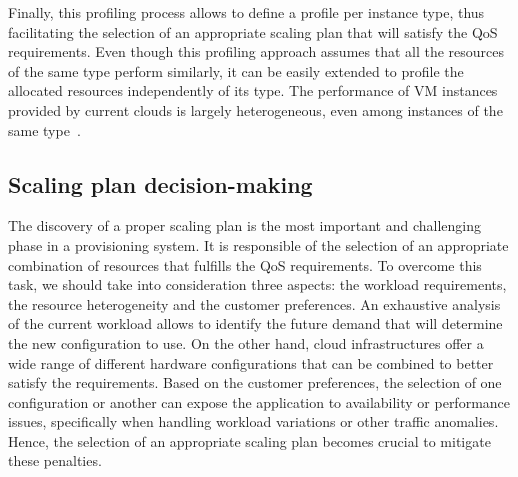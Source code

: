 \vspace{2mm}
Finally, this profiling process allows to define a profile per instance type, thus facilitating the selection of an appropriate scaling plan that will satisfy the QoS requirements. Even though this profiling approach assumes that all the resources of the same type perform similarly, it can be easily extended to profile the allocated resources independently of its type. The performance of VM instances provided by current clouds is largely heterogeneous, even among instances of the same type~\cite{ec2Performance}.




\subsection{Scaling plan decision-making}




The discovery of a proper scaling plan is the most important and challenging phase in a provisioning system. It is responsible of the selection of an appropriate combination of resources that fulfills the QoS requirements. To overcome this task, we should take into consideration three aspects: the workload requirements, the resource heterogeneity and the customer preferences. An exhaustive analysis of the current workload allows to identify the future demand that will determine the new configuration to use. On the other hand, cloud infrastructures offer a wide range of different hardware configurations that can be combined to better satisfy the requirements. Based on the customer preferences, the selection of one configuration or another can expose the application to availability or performance issues, specifically when handling workload variations or other traffic anomalies. Hence, the selection of an appropriate scaling plan becomes crucial to mitigate these penalties. 

